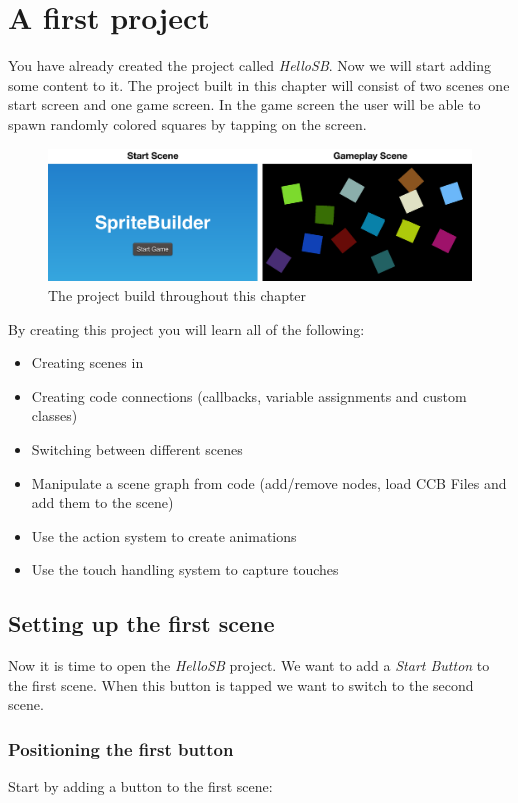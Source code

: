 \section{A first \SB{} project} 
You have already created the \SB{} project called \textit{HelloSB}. Now we will
start adding some content to it. The project built in this chapter will consist
of two scenes one start screen and one game screen. In the game screen the user will be able to spawn randomly
colored squares by tapping on the screen.
\begin{figure}[H]
		\centering
		\includegraphics[width=0.9\linewidth]{images/firstproject/first_project.png}
		\caption{The project build throughout this chapter}
\end{figure}
By creating this project you will learn all of the following:
\begin{itemize}
  \item Creating scenes in \SB{}
  \item Creating code connections (callbacks, variable assignments and custom
  classes)
  \item Switching between different scenes
  \item Manipulate a scene graph from code (add/remove nodes, load CCB Files and
  add them to the scene)
  \item Use the \cocos{} action system to create animations
  \item Use the \cocos{} touch handling system to capture touches
\end{itemize}

\subsection{Setting up the first scene}
Now it is time to open the \textit{HelloSB} \SB{} project. We want to add a
\textit{Start Button} to the first scene. When this button is tapped we want to
switch to the second scene. 

\subsubsection{Positioning the first button}
Start by adding a button to the first scene:

